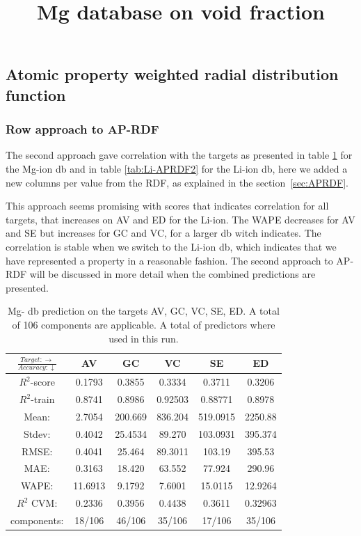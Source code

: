 \FloatBarrier
\subsection{Atomic property weighted radial distribution function}
\subsubsection{Row approach to AP-RDF }%

The second approach gave correlation with the targets as presented in table \ref{tab:Mg-APRDF2} for the Mg-ion db and in table \ref{tab:Li-APRDF2} for the Li-ion db, here we added a new columns per value from the RDF, as explained in the section \ref{sec:APRDF}. 

This approach seems promising with scores that indicates correlation for all targets, that increases on AV and ED for the Li-ion. The WAPE decreases for AV and SE but increases for GC and VC, for a larger db witch indicates. The correlation is stable when we switch to the Li-ion db, which indicates that we have represented a property in a reasonable fashion. The second approach to AP-RDF will be discussed in more detail when the combined predictions are presented.  


\begin{table}[h]
\normalsize
\centering
\caption{Mg- db prediction on the targets AV, GC, VC, SE, ED.  A total of 106 components are applicable. A total of  predictors where used in this run.}
\title{Mg database on void fraction}
\begin{tabular}{|c|c|c|c|c|c|}
	\hline 
	$\frac{Target: \rightarrow}{Accuracy:\downarrow} $ & AV & GC & VC & SE & ED 
	 \\ 
	\hline
	$R^2$-score & 0.1793 & 0.3855 & 0.3334 &  0.3711 &  0.3206\\ 
	\hline 
	$R^2$-train & 0.8741 &  0.8986 & 0.92503&  0.88771 & 0.8978 \\ 
	\hline
	Mean: 	&2.7054	&200.669&836.204	&519.0915&2250.88	\\
	\hline 
	Stdev: 	&0.4042	&25.4534	&89.270	&103.0931&395.374	\\
	\hline 
	RMSE: &0.4041& 25.464 &  89.3011 & 103.19 & 395.53 \\ 
	\hline
	MAE: & 0.3163 & 18.420& 63.552 &  77.924 & 290.96 \\ 
	\hline
	WAPE: &  11.6913 & 9.1792 & 7.6001  & 15.0115 & 12.9264 \\
	\hline
	$R^2$ CVM: & 0.2336 & 0.3956 &  0.4438  & 0.3611 & 0.32963 \\
	\hline
	components: & 18/106 & 46/106 & 35/106  & 17/106 & 35/106 \\
	\hline
\end{tabular}
\label{tab:Mg-APRDF2}
\end{table}

